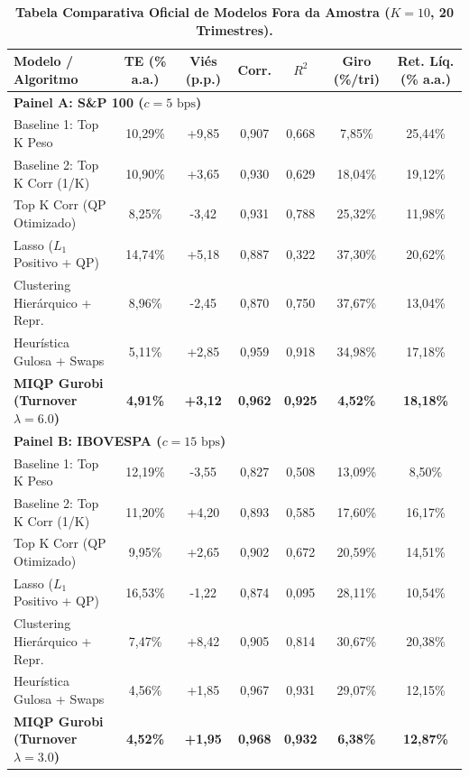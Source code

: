 \documentclass[11pt,a4paper]{article}
\begin{document}
\begin{table}[H]
\centering
\small
\caption{\textbf{Tabela Comparativa Oficial de Modelos Fora da Amostra ($K = 10$, 20 Trimestres).}}
\label{tab:comparativo_oficial}
\begin{tabularx}{\textwidth}{lcccccc}
\toprule
\textbf{Modelo / Algoritmo} & \textbf{TE (\% a.a.)} & \textbf{Viés (p.p.)} & \textbf{Corr.} & \textbf{$R^2$} & \textbf{Giro (\%/tri)} & \textbf{Ret. Líq. (\% a.a.)} \\
\midrule
\multicolumn{7}{l}{\textbf{Painel A: S\&P 100 ($c = 5\text{ bps}$)}} \\
Baseline 1: Top K Peso & 10,29\% & +9,85 & 0,907 & 0,668 & 7,85\% & 25,44\% \\
Baseline 2: Top K Corr (1/K) & 10,90\% & +3,65 & 0,930 & 0,629 & 18,04\% & 19,12\% \\
Top K Corr (QP Otimizado) & 8,25\% & -3,42 & 0,931 & 0,788 & 25,32\% & 11,98\% \\
Lasso ($L_1$ Positivo + QP) & 14,74\% & +5,18 & 0,887 & 0,322 & 37,30\% & 20,62\% \\
Clustering Hierárquico + Repr. & 8,96\% & -2,45 & 0,870 & 0,750 & 37,67\% & 13,04\% \\
Heurística Gulosa + Swaps & 5,11\% & +2,85 & 0,959 & 0,918 & 34,98\% & 17,18\% \\
\textbf{MIQP Gurobi (Turnover $\lambda=6.0$)} & \textbf{4,91\%} & \textbf{+3,12} & \textbf{0,962} & \textbf{0,925} & \textbf{4,52\%} & \textbf{18,18\%} \\
\midrule
\multicolumn{7}{l}{\textbf{Painel B: IBOVESPA ($c = 15\text{ bps}$)}} \\
Baseline 1: Top K Peso & 12,19\% & -3,55 & 0,827 & 0,508 & 13,09\% & 8,50\% \\
Baseline 2: Top K Corr (1/K) & 11,20\% & +4,20 & 0,893 & 0,585 & 17,60\% & 16,17\% \\
Top K Corr (QP Otimizado) & 9,95\% & +2,65 & 0,902 & 0,672 & 20,59\% & 14,51\% \\
Lasso ($L_1$ Positivo + QP) & 16,53\% & -1,22 & 0,874 & 0,095 & 28,11\% & 10,54\% \\
Clustering Hierárquico + Repr. & 7,47\% & +8,42 & 0,905 & 0,814 & 30,67\% & 20,38\% \\
Heurística Gulosa + Swaps & 4,56\% & +1,85 & 0,967 & 0,931 & 29,07\% & 12,15\% \\
\textbf{MIQP Gurobi (Turnover $\lambda=3.0$)} & \textbf{4,52\%} & \textbf{+1,95} & \textbf{0,968} & \textbf{0,932} & \textbf{6,38\%} & \textbf{12,87\%} \\
\bottomrule
\end{tabularx}
\end{table}
\end{document}

